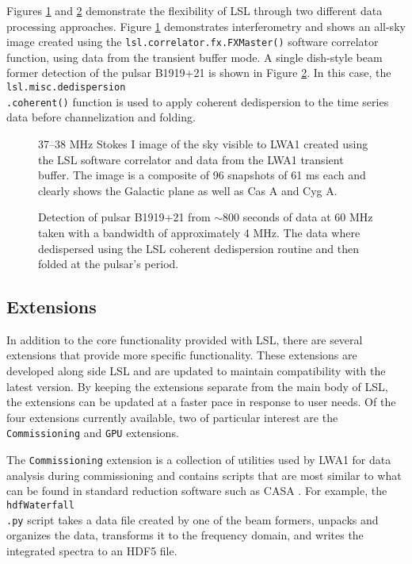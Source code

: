 Figures \ref{P42_fig:sky} and \ref{P42_fig:psr} demonstrate the flexibility of LSL through two different data processing approaches.  Figure \ref{P42_fig:sky} demonstrates interferometry and shows an all-sky image created using the {\tt lsl.correlator.fx.FXMaster()} software correlator function, using data from the transient buffer mode.  A single dish-style beam former detection of the pulsar B1919+21 is shown in Figure \ref{P42_fig:psr}.  In this case, the {\tt lsl.misc.dedispersion\\.coherent()} function is used to apply coherent dedispersion to the time series data before channelization and folding.

\begin{figure}
	\caption{\label{P42_fig:sky}37--38 MHz Stokes I image of the sky visible to LWA1 created using the LSL software correlator and data from the LWA1 transient buffer.  The image is a composite of 96 snapshots of 61 ms each and clearly shows the Galactic plane as well as Cas A and Cyg A.}
\end{figure}

\begin{figure}
	\caption{\label{P42_fig:psr}Detection of pulsar B1919+21 from $\sim$800 seconds of data at 60 MHz taken with a bandwidth of approximately 4 MHz.  The data where dedispersed using the LSL coherent dedispersion routine and then folded at the pulsar's period.}
\end{figure}

\subsection{Extensions}
In addition to the core functionality provided with LSL, there are several extensions that provide more specific functionality.  These extensions are developed along side LSL and  are updated to maintain compatibility with the latest version.  By keeping the extensions separate from the main body of LSL, the extensions can be updated at a faster pace in response to user needs.  Of the four extensions currently available, two of particular interest are the {\tt Commissioning} and {\tt {}GPU} extensions.

The {\tt Commissioning} extension is a collection of utilities used by LWA1 for data analysis during commissioning and contains scripts that are most similar to what can be found in standard reduction software such as CASA .  For example, the {\tt hdfWaterfall\\.py} script takes a data file created by one of the beam formers, unpacks and organizes the data, transforms it to the frequency domain, and writes the integrated spectra to an HDF5 file.  

